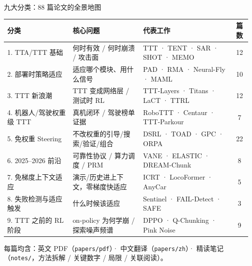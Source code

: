 \documentclass[10pt,aspectratio=169]{beamer}
\begin{document}
\begin{frame}{九大分类：88 篇论文的全景地图}
\small
\begin{tabular}{p{}p{}p{}c}
\toprule
\textbf{分类} & \textbf{核心问题} & \textbf{代表工作} & \textbf{篇数}\\
\midrule
1. TTA/TTT 基础 & 何时有效 / 何时崩溃 / 攻击面 & TTT · TENT · SAR · SHOT · MEMO & 12\\
2. 部署时策略适应 & 适应哪个模块、用什么信号 & PAD · RMA · Neural-Fly · MAML & 10\\
3. TTT 新浪潮 & TTT 变成网络层 / 测试时 RL & TTT-Layers · Titans · LaCT · TTRL & 12\\
4. 机器人/驾驶权重级 TTT & 真机闭环 / 驾驶榜单证据 & RoboTTT · Centaur · TTT-Parkour & 7\\
5. 免权重 Steering & 不改权重的引导/搜索/验证/组合 & DSRL · TOAD · GPC · ORPA & 22\\
6. 2025--2026 前沿 & 可靠性协议 / 算力调度 / PRM & VANE · ELASTIC · DREAM-Chunk & 8\\
7. 免梯度上下文适应 & 演示/历史进上下文，零梯度快适应 & ICRT · LocoFormer · AnyCar & 5\\
8. 失败检测与适应触发 & 什么时候该适应 & Sentinel · FAIL-Detect · SAFE & 3\\
9. TTT 之前的 RL 阶段 & on-policy 为何学崩 / 探索噪声频谱 & DPPO · Q-Chunking · Pink Noise & 9\\
\bottomrule
\end{tabular}
\vspace{6pt}

\footnotesize 每篇均含：英文 PDF（\texttt{papers/pdf}）· 中文翻译（\texttt{papers/zh}）· 精读笔记（\texttt{notes/}，方法拆解 / 关键数字 / 局限 / 关联阅读）。
\end{frame}
\end{document}
